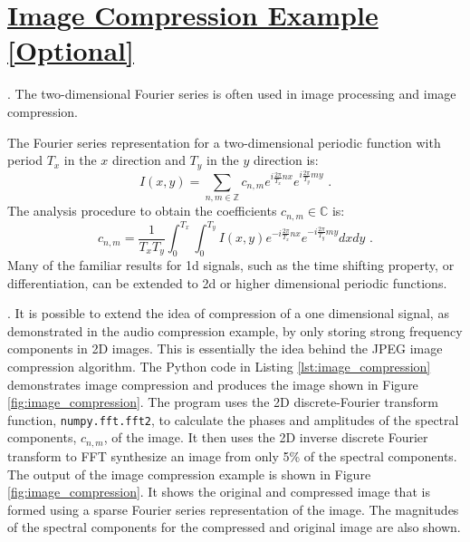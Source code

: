 \newpage
\section{\href{https://juha.no/signal/image-compression/}{Image Compression Example [Optional]}}
. The two-dimensional 
  Fourier series is often used in image processing and image
compression.

The Fourier series representation for a two-dimensional periodic
function with period $T_x$ in the $x$ direction and $T_y$ in the $y$
direction is:
\begin{equation}
I(x,y) = \sum_{n,m \in \mathbb{Z}} c_{n,m} e^{i \frac{2\pi}{T_x}nx} e^{i \frac{2\pi}{T_y}my} \,\,.
\end{equation}
The analysis procedure to obtain the coefficients $c_{n,m}\in \mathbb{C}$ is:
\begin{equation}
c_{n,m} = \frac{1}{T_x T_y}\int_{0}^{T_x}\int_0^{T_y} I(x,y) e^{-i \frac{2\pi}{T_x}nx} e^{-i \frac{2\pi}{T_y}my}dx dy \,\,.
\label{eq:2d_analysis}
\end{equation}
Many of the familiar results for 1d signals, such as the time shifting
property, or differentiation, can be extended to 2d or higher
dimensional periodic functions. 


.  It is possible to
extend the idea of compression of a one dimensional signal, as
demonstrated in the audio compression example, by only storing strong
frequency components in 2D images. This is essentially the idea
behind the JPEG image compression algorithm.  The Python code in
Listing \ref{lst:image_compression} demonstrates image compression and
produces the image shown in Figure \ref{fig:image_compression}. The
program uses the 2D discrete-Fourier transform function,
\verb|numpy.fft.fft2|, to calculate the phases and amplitudes of the
spectral components, $c_{n,m}$, of the image. It then uses the 2D
inverse discrete Fourier transform to FFT synthesize an image from
only 5\% of the spectral components. The output of the image
compression example is shown in Figure \ref{fig:image_compression}. It
shows the original and compressed image that is formed using a sparse
Fourier series representation of the image. The magnitudes of the
spectral components for the compressed and original image are also
shown.

